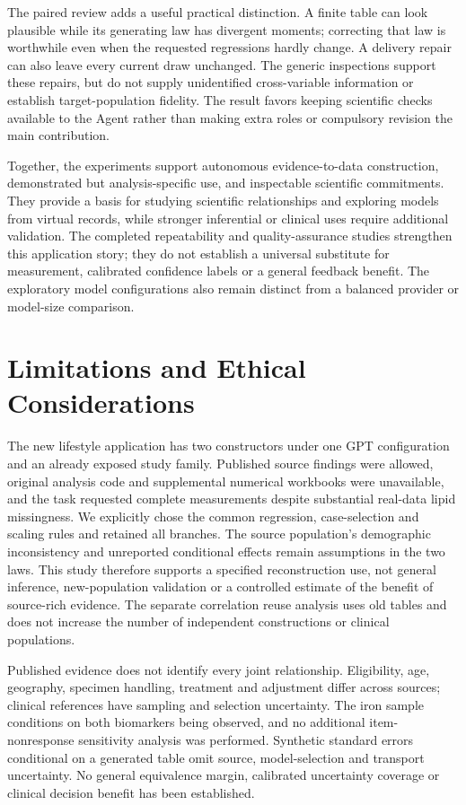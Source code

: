 \documentclass[11pt,letterpaper]{article}
\begin{document}
The paired review adds a useful practical distinction. A finite table can look plausible while its generating law has divergent moments; correcting that law is worthwhile even when the requested regressions hardly change. A delivery repair can also leave every current draw unchanged. The generic inspections support these repairs, but do not supply unidentified cross-variable information or establish target-population fidelity. The result favors keeping scientific checks available to the Agent rather than making extra roles or compulsory revision the main contribution.


Together, the experiments support autonomous evidence-to-data construction, demonstrated but analysis-specific use, and inspectable scientific commitments. They provide a basis for studying scientific relationships and exploring models from virtual records, while stronger inferential or clinical uses require additional validation. The completed repeatability and quality-assurance studies strengthen this application story; they do not establish a universal substitute for measurement, calibrated confidence labels or a general feedback benefit. The exploratory model configurations also remain distinct from a balanced provider or model-size comparison.



\section{Limitations and Ethical Considerations}

The new lifestyle application has two constructors under one GPT configuration and an already exposed study family. Published source findings were allowed, original analysis code and supplemental numerical workbooks were unavailable, and the task requested complete measurements despite substantial real-data lipid missingness. We explicitly chose the common regression, case-selection and scaling rules and retained all branches. The source population's demographic inconsistency and unreported conditional effects remain assumptions in the two laws. This study therefore supports a specified reconstruction use, not general inference, new-population validation or a controlled estimate of the benefit of source-rich evidence. The separate correlation reuse analysis uses old tables and does not increase the number of independent constructions or clinical populations.


Published evidence does not identify every joint relationship. Eligibility, age, geography, specimen handling, treatment and adjustment differ across sources; clinical references have sampling and selection uncertainty. The iron sample conditions on both biomarkers being observed, and no additional item-nonresponse sensitivity analysis was performed. Synthetic standard errors conditional on a generated table omit source, model-selection and transport uncertainty. No general equivalence margin, calibrated uncertainty coverage or clinical decision benefit has been established.
\end{document}
